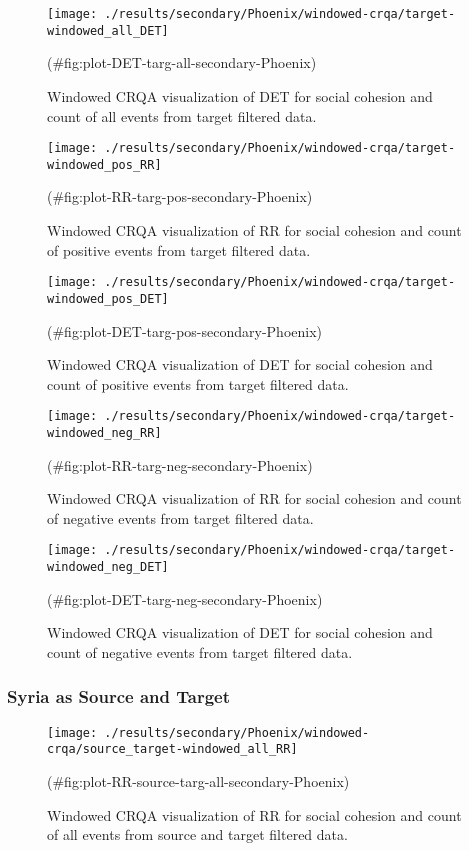 \begin{appendix}
\begin{figure}
\texttt{[image: ./results/secondary/Phoenix/windowed-crqa/target-windowed\_all\_DET]} \caption{Windowed CRQA visualization of DET for social cohesion and count of all events from target filtered data.}(\#fig:plot-DET-targ-all-secondary-Phoenix)
\end{figure}

\begin{figure}
\texttt{[image: ./results/secondary/Phoenix/windowed-crqa/target-windowed\_pos\_RR]} \caption{Windowed CRQA visualization of RR for social cohesion and count of positive events from target filtered data.}(\#fig:plot-RR-targ-pos-secondary-Phoenix)
\end{figure}

\begin{figure}
\texttt{[image: ./results/secondary/Phoenix/windowed-crqa/target-windowed\_pos\_DET]} \caption{Windowed CRQA visualization of DET for social cohesion and count of positive events from target filtered data.}(\#fig:plot-DET-targ-pos-secondary-Phoenix)
\end{figure}

\begin{figure}
\texttt{[image: ./results/secondary/Phoenix/windowed-crqa/target-windowed\_neg\_RR]} \caption{Windowed CRQA visualization of RR for social cohesion and count of negative events from target filtered data.}(\#fig:plot-RR-targ-neg-secondary-Phoenix)
\end{figure}

\begin{figure}
\texttt{[image: ./results/secondary/Phoenix/windowed-crqa/target-windowed\_neg\_DET]} \caption{Windowed CRQA visualization of DET for social cohesion and count of negative events from target filtered data.}(\#fig:plot-DET-targ-neg-secondary-Phoenix)
\end{figure}

\hypertarget{syria-as-source-and-target}{%
\subsubsection{Syria as Source and
Target}\label{syria-as-source-and-target}}

\begin{figure}
\texttt{[image: ./results/secondary/Phoenix/windowed-crqa/source\_target-windowed\_all\_RR]} \caption{Windowed CRQA visualization of RR for social cohesion and count of all events from source and target filtered data.}(\#fig:plot-RR-source-targ-all-secondary-Phoenix)
\end{figure}


\end{appendix}
